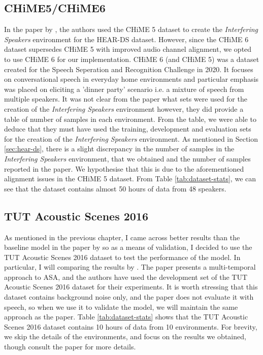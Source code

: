 \documentclass[logo,bsc,singlespacing,parskip,online]{infthesis}
\begin{document}
\subsection{CHiME5/CHiME6}
In the paper by \citet{Huwel2020HearDS}, the authors used the CHiME 5 dataset to create the \textit{Interfering Speakers} environment for the HEAR-DS dataset.
However, since the CHiME 6 dataset supersedes CHiME 5 with improved audio channel alignment, we opted to use CHiME 6 for our implementation.
CHiME 6 (and CHiME 5) was a dataset created for the Speech Seperation and Recognition Challenge in 2020. It 
focuses on conversational speech in everyday home environments and particular emphasis was placed on 
eliciting a 'dinner party' scenario i.e. a mixture of speech from multiple speakers. It was not 
clear from the paper what sets were used for the creation of the \textit{Interfering Speakers} environment 
however, they did provide a table of number of samples in each environment. From the table, we 
were able to deduce that they must have used the training, development and evaluation sets for the creation of the \textit{Interfering Speakers} environment.
As mentioned in Section \ref{sec:hear-ds}, there is a slight discrepancy in the number of samples in the \textit{Interfering Speakers} environment, 
that we obtained and the number of samples reported in the paper. We hypothesise that this is due to the aforementioned alignment issues in the CHiME 5 dataset.
From Table \ref{tab:dataset-stats}, we can see that the dataset contains almost 50 hours of data from 48 speakers. 

\subsection{TUT Acoustic Scenes 2016}
As mentioned in the previous chapter, I came across better results than the baseline model in the paper by \citet{Huwel2020HearDS} 
so as a means of validation, I decided to use the TUT Acoustic Scenes 2016 dataset \cite{mesaros_tut_2016} to test the performance of the model.
In particular, I will comparing the results by \citet{schindler_multi-temporal_2018}. The paper presents a multi-temporal approach to ASA, and 
the authors have used the development set of the TUT Acoustic Scenes 2016 dataset for their experiments. It is worth stressing 
that this dataset contains background noise only, and the paper does not evaluate it with speech, so when we use it to validate 
the model, we will maintain the same approach as the paper.
Table \ref{tab:dataset-stats} shows that the TUT Acoustic Scenes 2016 dataset contains 10 hours of data from 10 environments.
For brevity, we skip the details of the environments, and focus on the results we obtained, though consult the paper for more details.
\end{document}

